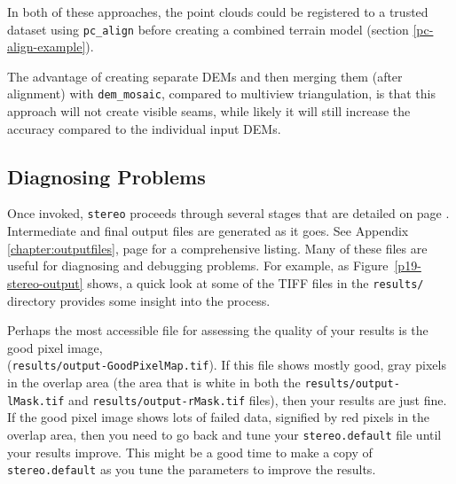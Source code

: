 In both of these approaches, the point clouds could be registered
to a trusted dataset using \texttt{pc\_align} before creating a combined
terrain model (section \ref{pc-align-example}).

The advantage of creating separate DEMs and then merging them (after
alignment) with \texttt{dem\_mosaic}, compared to multiview triangulation,
is that this approach will not create visible seams, while likely it will
still increase the accuracy compared to the individual input DEMs.

\subsection{Diagnosing Problems}

Once invoked, \texttt{stereo} proceeds through several stages that are
detailed on page \pageref{entrypoints}.  Intermediate and final output
files are generated as it goes.  See Appendix
\ref{chapter:outputfiles}, page \pageref{chapter:outputfiles} for a
comprehensive listing.  Many of these files are useful for diagnosing and
debugging problems.  For example, as Figure~\ref{p19-stereo-output}
shows, a quick look at some of the TIFF files in the \texttt{results/}
directory provides some insight into the process.

Perhaps the most accessible file for assessing the quality of your
results is the good pixel image, \\
(\texttt{results/output-GoodPixelMap.tif}).  If this file shows mostly
good, gray pixels in the overlap area (the area that is white in both
the \texttt{results/output-lMask.tif} and
\texttt{results/output-rMask.tif} files), then your results are just
fine.  If the good pixel image shows lots of failed data, signified by
red pixels in the overlap area, then you need to go back and tune your
\texttt{stereo.default} file until your results improve.  This might be
a good time to make a copy of \texttt{stereo.default} as you tune the
parameters to improve the results.

